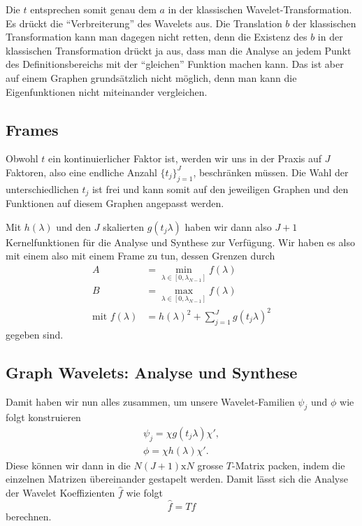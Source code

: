 Die $t$ entsprechen somit genau dem $a$ in der klassischen 
Wavelet-Transformation. Es dr\"uckt die ``Verbreiterung'' des Wavelets aus.
Die Translation $b$ der klassischen Transformation kann man dagegen nicht 
retten, denn die Existenz des $b$ in der klassischen Transformation drückt ja 
aus, dass man die Analyse an jedem Punkt des Definitionsbereichs mit der 
``gleichen'' Funktion machen kann. Das ist aber auf einem Graphen 
grunds\"atzlich nicht m\"oglich, denn man kann die Eigenfunktionen nicht 
miteinander vergleichen.

\subsection{Frames}

Obwohl $t$ ein kontinuierlicher Faktor ist, werden wir uns in der Praxis auf 
$J$ Faktoren, also eine endliche Anzahl $\{t_j\}^J_{j=1}$, beschr\"anken 
m\"ussen. Die Wahl der unterschiedlichen $t_j$ ist frei und kann somit auf den 
jeweiligen Graphen und den Funktionen auf diesem Graphen angepasst werden. 

Mit $h(\lambda)$ und den $J$ skalierten $g(t_j\lambda)$ haben wir dann 
also $J + 1$ Kernelfunktionen f\"ur die Analyse und Synthese zur Verf\"ugung. 
Wir haben es also mit einem also mit einem Frame zu tun, dessen Grenzen durch
\begin{align*}
A &= \min_{\lambda \in \left[0, \lambda_{N-1}\right]} f(\lambda) \\
B &= \max_{\lambda \in \left[0, \lambda_{N-1}\right]} f(\lambda) \\
\text{mit } f(\lambda) &= h(\lambda)^2 + \sum_{j = 1}^{J} g(t_j\lambda)^2
\end{align*}
gegeben sind.

\subsection{Graph Wavelets: Analyse und Synthese}

Damit haben wir nun alles zusammen, um unsere Wavelet-Familien $\psi_j$ und 
$\phi$ wie folgt konstruieren
\begin{align}
\psi_j = \chi g(t_j\lambda) \chi',
\label{eq:sgwt:psi}
\\
\phi = \chi h(\lambda) \chi'.
\label{eq:sgwt:phi}
\end{align}
Diese k\"onnen wir dann in die $N(J+1)\text{x}N$ grosse $T$-Matrix 
packen, indem die einzelnen Matrizen \"ubereinander gestapelt werden. Damit 
l\"asst sich die Analyse der Wavelet Koeffizienten $\hat{f}$ wie folgt
\begin{equation}
\hat{f} = T f
\label{eq:sgwt:hatf}
\end{equation}
berechnen.

